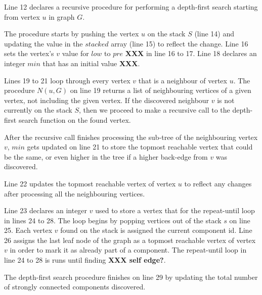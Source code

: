 \documentclass{l4proj}
\begin{document}
\noindent Line 12 declares a recursive procedure for performing a depth-first search starting from vertex $u$ in graph $G$.

\noindent The procedure starts by pushing the vertex $u$ on the stack $S$ (line 14) and updating the value in the $stacked$ array (line 15) to reflect the change. Line 16 sets the vertex's $v$ value for $low$ to $pre$ \textbf{XXX} in line 16 to 17. Line 18 declares an integer $min$ that has an initial value \textbf{XXX}.

\noindent Lines 19 to 21 loop through every vertex $v$ that is a neighbour of vertex $u$. The procedure $N(u, G)$ on line 19 returns a list of neighbouring vertices of a given vertex, not including the given vertex. If the discovered neighbour $v$ is not currently on the stack $S$, then we proceed to make a recursive call to the depth-first search function on the found vertex.

\noindent After the recursive call finishes processing the sub-tree of the neighbouring vertex $v$, $min$ gets updated on line 21 to store the topmost reachable vertex that could be the same, or even higher in the tree if a higher back-edge from $v$ was discovered.

\noindent Line 22 updates the topmost reachable vertex of vertex $u$ to reflect any changes after processing all the neighbouring vertices.

\noindent Line 23 declares an integer $v$ used to store a vertex that for the repeat-until loop in lines 24 to 28. The loop begins by popping vertices out of the stack $s$ on line 25. Each vertex $v$ found on the stack is assigned the current component id. Line 26 assigns the last leaf node of the graph as a topmost reachable vertex of vertex $v$ in order to mark it as already part of a component. The repeat-until loop in line 24 to 28 is runs until finding \textbf{XXX self edge?}.

\noindent The depth-first search procedure finishes on line 29 by updating the total number of strongly connected components discovered.

\clearpage
\end{document}
